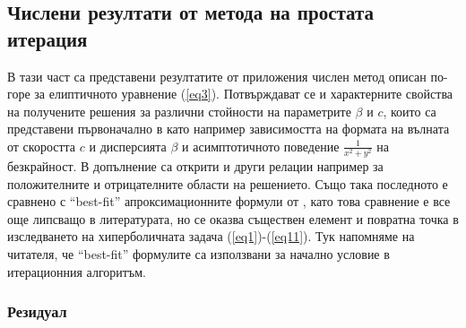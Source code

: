 \documentclass[a4paper]{article}
\newcommand{\rf}[1]{(\ref{#1})}
\theoremstyle{remark}
\begin{document}
\subsection{Числени резултати от метода на простата итерация}\label{resultsElliptic}
В тази част са представени резултатите от приложения числен метод описан по-горе за елиптичното уравнение \rf{eq3}. Потвърждават се и характерните свойства на получените решения за различни стойности на параметрите $\beta$ и $c$, които са представени първоначално в \cite{ref116,Ch2011} като например зависимостта на формата на вълната от скоростта $c$ и дисперсията $\beta$ и асимптотичното поведение $\frac{1}{x^2 + y^2}$ на безкрайност. В допълнение са открити и други релации например за положителните и отрицателните области на решението.
Също така последното е сравнено с ``best-fit'' апроксимационните формули от \cite{Ch2011}, като това сравнение е все още липсващо в литературата, но се оказва съществен елемент и повратна точка в изследването на хиперболичната задача \rf{eq1}-\rf{eq11}. Тук напомняме на читателя, че ``best-fit'' формулите са използвани за начално условие в итерационния алгоритъм.

\subsubsection{Резидуал}
\end{document}

